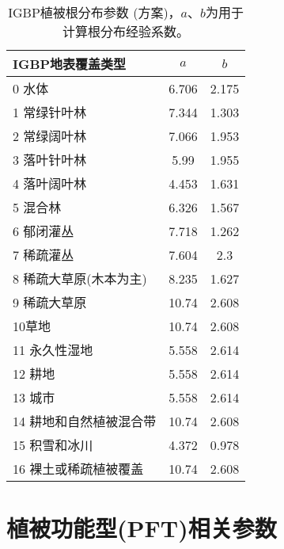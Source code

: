 \begin{table}[htbp]
\centering
\caption{IGBP植被根分布参数 (\citet{zeng2001global}方案)，$a$、$b$为用于计算根分布经验系数。}
\label{tab:IGBP植被根分布参数zeng方案}
\begin{tabular}{@{}lcc@{}}
\toprule
IGBP地表覆盖类型     & $a$ & $b$ \\ \midrule
0 水体            & 6.706           & 2.175 \\ \midrule
1 常绿针叶林       & 7.344          & 1.303          \\
2 常绿阔叶林       & 7.066          & 1.953          \\
3 落叶针叶林       & 5.99           & 1.955          \\
4 落叶阔叶林       & 4.453          & 1.631          \\
5 混合林         & 6.326          & 1.567          \\
6 郁闭灌丛        & 7.718          & 1.262          \\
7 稀疏灌丛        & 7.604          & 2.3            \\
8 稀疏大草原(木本为主) & 8.235          & 1.627          \\
9 稀疏大草原       & 10.74          & 2.608          \\
10草地          & 10.74          & 2.608          \\
11 永久性湿地      & 5.558          & 2.614          \\
12 耕地         & 5.558          & 2.614          \\
13 城市         & 5.558          & 2.614          \\
14 耕地和自然植被混合带 & 10.74          & 2.608          \\
15 积雪和冰川      & 4.372          & 0.978          \\
16 裸土或稀疏植被覆盖  & 10.74          & 2.608          \\ \bottomrule
\end{tabular}
\end{table}


\chapter{植被功能型(PFT)相关参数}\label{植被功能型PFT相关参数}

